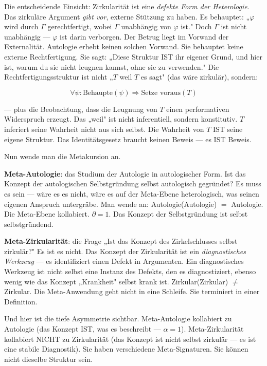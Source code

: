 \documentclass[10pt, openany, oneside]{book}
\begin{document}
\vspace{0.8em}

\noindent Die entscheidende Einsicht: Zirkularität ist eine \textit{defekte Form der Heterologie}. Das zirkuläre Argument \textit{gibt vor}, externe Stützung zu haben. Es behauptet: „$\varphi$ wird durch $\Gamma$ gerechtfertigt, wobei $\Gamma$ unabhängig von $\varphi$ ist." Doch $\Gamma$ ist nicht unabhängig --- $\varphi$ ist darin verborgen. Der Betrug liegt im Vorwand der Externalität. Autologie erhebt keinen solchen Vorwand. Sie behauptet keine externe Rechtfertigung. Sie sagt: „Diese Struktur IST ihr eigener Grund, und hier ist, warum du sie nicht leugnen kannst, ohne sie zu verwenden." Die Rechtfertigungsstruktur ist nicht „$T$ weil $T$ es sagt" (das wäre zirkulär), sondern:

$$\forall \psi: \text{Behaupte}(\psi) \Rightarrow \text{Setze voraus}(T)$$

--- plus die Beobachtung, dass die Leugnung von $T$ einen performativen Widerspruch erzeugt. Das „weil" ist nicht inferentiell, sondern konstitutiv. $T$ inferiert seine Wahrheit nicht aus sich selbst. Die Wahrheit von $T$ IST seine eigene Struktur. Das Identitätsgesetz braucht keinen Beweis --- es IST Beweis.

Nun wende man die Metakursion an.

\textbf{Meta-Autologie}: das Studium der Autologie in autologischer Form. Ist das Konzept der autologischen Selbstgründung selbst autologisch gegründet? Es muss es sein --- wäre es es nicht, wäre es auf der Meta-Ebene heterologisch, was seinen eigenen Anspruch untergräbe. Man wende an: Autologie(Autologie) $=$ Autologie. Die Meta-Ebene kollabiert. $\partial = 1$. Das Konzept der Selbstgründung ist selbst selbstgründend.

\textbf{Meta-Zirkularität}: die Frage „Ist das Konzept des Zirkelschlusses selbst zirkulär?" Es ist es nicht. Das Konzept der Zirkularität ist ein \textit{diagnostisches Werkzeug} --- es identifiziert einen Defekt in Argumenten. Ein diagnostisches Werkzeug ist nicht selbst eine Instanz des Defekts, den es diagnostiziert, ebenso wenig wie das Konzept „Krankheit" selbst krank ist. Zirkular(Zirkular) $\neq$ Zirkular. Die Meta-Anwendung geht nicht in eine Schleife. Sie terminiert in einer Definition.

Und hier ist die tiefe Asymmetrie sichtbar. Meta-Autologie kollabiert zu Autologie (das Konzept IST, was es beschreibt --- $\alpha = 1$). Meta-Zirkularität kollabiert NICHT zu Zirkularität (das Konzept ist nicht selbst zirkulär --- es ist eine stabile Diagnostik). Sie haben verschiedene Meta-Signaturen. Sie können nicht dieselbe Struktur sein.
\end{document}
